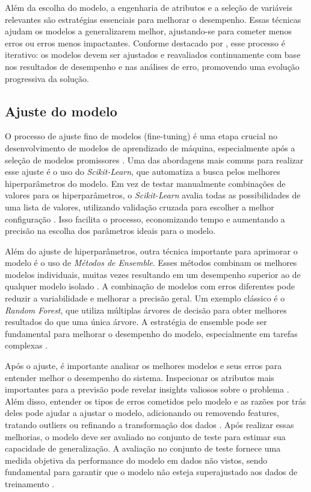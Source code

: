 Além da escolha do modelo, a engenharia de atributos e a seleção de variáveis relevantes são estratégias essenciais para melhorar o desempenho. Essas técnicas ajudam os modelos a generalizarem melhor, ajustando-se para cometer menos erros ou erros menos impactantes. Conforme destacado por , esse processo é iterativo: os modelos devem ser ajustados e reavaliados continuamente com base nos resultados de desempenho e nas análises de erro, promovendo uma evolução progressiva da solução.

\subsection{Ajuste do modelo}

O processo de ajuste fino de modelos (fine-tuning) é uma etapa crucial no desenvolvimento de modelos de aprendizado de máquina, especialmente após a seleção de modelos promissores \cite{geron2017}. Uma das abordagens mais comuns para realizar esse ajuste é o uso do \textit{Scikit-Learn}, que automatiza a busca pelos melhores hiperparâmetros do modelo. Em vez de testar manualmente combinações de valores para os hiperparâmetros, o \textit{Scikit-Learn} avalia todas as possibilidades de uma lista de valores, utilizando validação cruzada para escolher a melhor configuração \cite{geron2017}. Isso facilita o processo, economizando tempo e aumentando a precisão na escolha dos parâmetros ideais para o modelo.

Além do ajuste de hiperparâmetros, outra técnica importante para aprimorar o modelo é o uso de \textit{Métodos de Ensemble}. Esses métodos combinam os melhores modelos individuais, muitas vezes resultando em um desempenho superior ao de qualquer modelo isolado \cite{geron2017}. A combinação de modelos com erros diferentes pode reduzir a variabilidade e melhorar a precisão geral. Um exemplo clássico é o \textit{Random Forest}, que utiliza múltiplas árvores de decisão para obter melhores resultados do que uma única árvore. A estratégia de ensemble pode ser fundamental para melhorar o desempenho do modelo, especialmente em tarefas complexas \cite{geron2017}.

Após o ajuste, é importante analisar os melhores modelos e seus erros para entender melhor o desempenho do sistema. Inspecionar os atributos mais importantes para a previsão pode revelar insights valiosos sobre o problema \cite{muller2017}. Além disso, entender os tipos de erros cometidos pelo modelo e as razões por trás deles pode ajudar a ajustar o modelo, adicionando ou removendo features, tratando outliers ou refinando a transformação dos dados \cite{muller2017}. Após realizar essas melhorias, o modelo deve ser avaliado no conjunto de teste para estimar sua capacidade de generalização. A avaliação no conjunto de teste fornece uma medida objetiva da performance do modelo em dados não vistos, sendo fundamental para garantir que o modelo não esteja superajustado aos dados de treinamento \cite{muller2017}.

